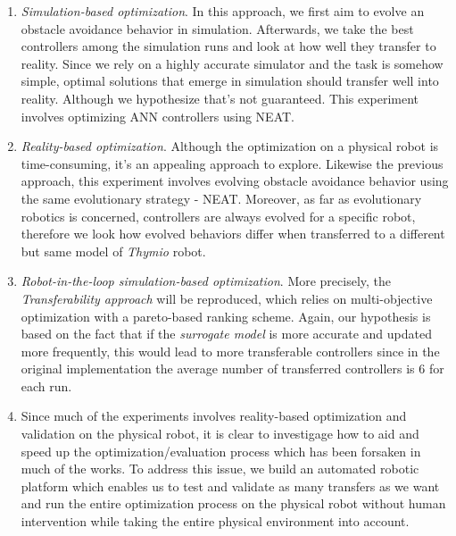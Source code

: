 \begin{enumerate}
    \item{\emph{Simulation-based optimization}. In this approach, we first aim to evolve an obstacle avoidance behavior in simulation. Afterwards, we take the best controllers among the simulation runs and look at how well they transfer to reality. Since we rely on a highly accurate simulator and the task is somehow simple, optimal solutions that emerge in simulation should transfer well into reality. Although we hypothesize that's not guaranteed. This experiment involves optimizing ANN controllers using NEAT.}
    
    \item{\emph{Reality-based optimization}. Although the optimization on a physical robot is time-consuming, it's an appealing approach to explore. Likewise the previous approach, this experiment involves evolving obstacle avoidance behavior using the same evolutionary strategy - NEAT. Moreover, as far as evolutionary robotics is concerned, controllers are always evolved for a specific robot, therefore we look how evolved behaviors differ when transferred to a different but same model of \emph{Thymio} robot.}
    
    \item{\emph{Robot-in-the-loop simulation-based optimization}. More precisely, the \emph{Transferability approach} will be reproduced, which relies on multi-objective optimization with a pareto-based ranking scheme. Again, our  hypothesis is based on the fact that if the \textit{surrogate model} is more accurate and updated more frequently, this would lead to more transferable controllers since in the original implementation the average number of transferred controllers is 6 for each run.}
    
    \item{Since much of the experiments involves reality-based optimization and validation on the physical robot, it is clear to investigage how to aid and speed up the optimization/evaluation process which has been forsaken in much of the works. To address this issue, we build an automated robotic platform which enables us to test and validate as many transfers as we want and run the entire optimization process on the physical robot without human intervention while taking the entire physical environment into account.}
\end{enumerate}




